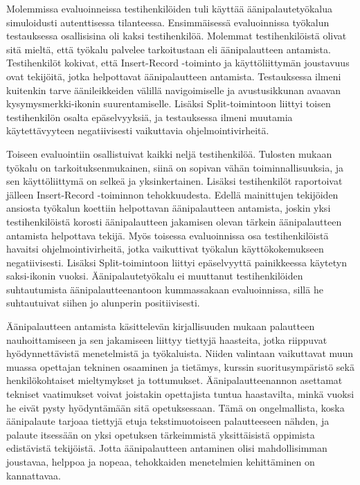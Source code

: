 \documentclass[utf8]{gradu3}
\begin{document}
Molemmissa evaluoinneissa testihenkilöiden tuli käyttää äänipalautetyökalua simuloidusti autenttisessa tilanteessa. Ensimmäisessä evaluoinnissa työkalun testauksessa osallisisina oli kaksi testihenkilöä. Molemmat testihenkilöistä olivat sitä mieltä, että työkalu palvelee tarkoitustaan eli äänipalautteen antamista. Testihenkilöt kokivat, että Insert-Record -toiminto ja käyttöliittymän joustavuus ovat tekijöitä, jotka helpottavat äänipalautteen antamista. Testauksessa ilmeni kuitenkin tarve äänileikkeiden välillä navigoimiselle ja avustusikkunan avaavan kysymysmerkki-ikonin suurentamiselle. Lisäksi Split-toimintoon liittyi toisen testihenkilön osalta epäselvyyksiä, ja testauksessa ilmeni muutamia käytettävyyteen negatiivisesti vaikuttavia ohjelmointivirheitä.

Toiseen evaluointiin osallistuivat kaikki neljä testihenkilöä. Tulosten mukaan työkalu on tarkoituksenmukainen, siinä on sopivan vähän toiminnallisuuksia, ja sen käyttöliittymä on selkeä ja yksinkertainen. Lisäksi testihenkilöt raportoivat jälleen Insert-Record -toiminnon tehokkuudesta. Edellä mainittujen tekijöiden ansiosta työkalun koettiin helpottavan äänipalautteen antamista, joskin yksi testihenkilöistä korosti äänipalautteen jakamisen olevan tärkein äänipalautteen antamista helpottava tekijä. Myös toisessa evaluoinnissa osa testihenkilöistä havaitsi ohjelmointivirheitä, jotka vaikuttivat työkalun käyttökokemukseen negatiivisesti. Lisäksi Split-toimintoon liittyi epäselvyyttä painikkeessa käytetyn saksi-ikonin vuoksi. Äänipalautetyökalu ei muuttanut testihenkilöiden suhtautumista äänipalautteenantoon kummassakaan evaluoinnissa, sillä he suhtautuivat siihen jo alunperin positiivisesti.

Äänipalautteen antamista käsittelevän kirjallisuuden mukaan palautteen nauhoittamiseen ja sen jakamiseen liittyy tiettyjä haasteita, jotka riippuvat hyödynnettävistä menetelmistä ja työkaluista. Niiden valintaan vaikuttavat muun muassa opettajan tekninen osaaminen ja tietämys, kurssin suoritusympäristö sekä henkilökohtaiset mieltymykset ja tottumukset. Äänipalautteenannon asettamat tekniset vaatimukset voivat joistakin opettajista tuntua haastavilta, minkä vuoksi he eivät pysty hyödyntämään sitä opetuksessaan. Tämä on ongelmallista, koska äänipalaute tarjoaa tiettyjä etuja tekstimuotoiseen palautteeseen nähden, ja palaute itsessään on yksi opetuksen tärkeimmistä yksittäisistä oppimista edistävistä tekijöistä. Jotta äänipalautteen antaminen olisi mahdollisimman joustavaa, helppoa ja nopeaa, tehokkaiden menetelmien kehittäminen on kannattavaa.
\end{document}
